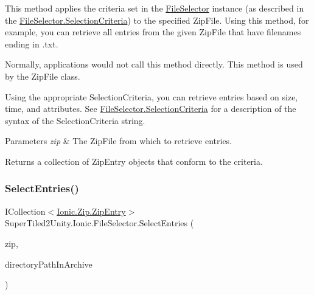 This method applies the criteria set in the \mbox{\hyperlink{class_super_tiled2_unity_1_1_ionic_1_1_file_selector}{File\+Selector}} instance (as described in the \mbox{\hyperlink{class_super_tiled2_unity_1_1_ionic_1_1_file_selector_a0f2d26f8fb39862f504bc0069365ff39}{File\+Selector.\+Selection\+Criteria}}) to the specified Zip\+File. Using this method, for example, you can retrieve all entries from the given Zip\+File that have filenames ending in .txt. 

Normally, applications would not call this method directly. This method is used by the Zip\+File class. 

Using the appropriate Selection\+Criteria, you can retrieve entries based on size, time, and attributes. See \mbox{\hyperlink{class_super_tiled2_unity_1_1_ionic_1_1_file_selector_a0f2d26f8fb39862f504bc0069365ff39}{File\+Selector.\+Selection\+Criteria}} for a description of the syntax of the Selection\+Criteria string. 


\begin{DoxyParams}{Parameters}
{\em zip} & The Zip\+File from which to retrieve entries.\\
\hline
\end{DoxyParams}


\begin{DoxyReturn}{Returns}
a collection of Zip\+Entry objects that conform to the criteria.
\end{DoxyReturn}
\mbox{\label{class_super_tiled2_unity_1_1_ionic_1_1_file_selector_ab70d506c4868dac72f93573fbd5f1f92}} 
\subsubsection{\texorpdfstring{Select\+Entries()}{SelectEntries()}\hspace{0.1cm}{\footnotesize\ttfamily [2/2]}}
{\footnotesize\ttfamily I\+Collection$<$\mbox{\hyperlink{class_super_tiled2_unity_1_1_ionic_1_1_zip_1_1_zip_entry}{Ionic.\+Zip.\+Zip\+Entry}}$>$ Super\+Tiled2\+Unity.\+Ionic.\+File\+Selector.\+Select\+Entries (\begin{DoxyParamCaption}\item[{\mbox{\hyperlink{class_super_tiled2_unity_1_1_ionic_1_1_zip_1_1_zip_file}{Ionic.\+Zip.\+Zip\+File}}}]{zip,  }\item[{string}]{directory\+Path\+In\+Archive }\end{DoxyParamCaption})}



